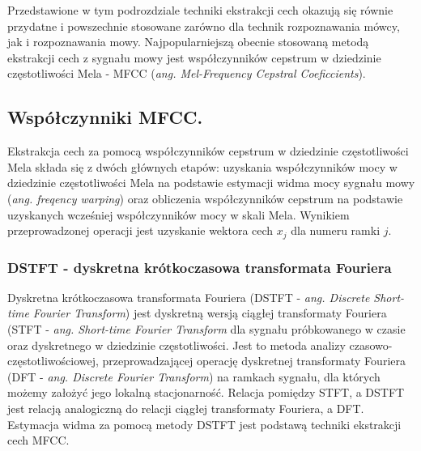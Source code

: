 Przedstawione w tym podrozdziale techniki ekstrakcji cech okazują się równie przydatne i powszechnie stosowane zarówno dla technik rozpoznawania mówcy, jak i rozpoznawania mowy. Najpopularniejszą obecnie stosowaną metodą ekstrakcji cech z sygnału mowy jest współczynników cepstrum w dziedzinie częstotliwości Mela -  MFCC (\textit{ang. Mel-Frequency Cepstral Coeficcients}). 

\subsection{Współczynniki MFCC.}
\label{mfcc}

Ekstrakcja cech za pomocą współczynników cepstrum w dziedzinie częstotliwości Mela składa się z dwóch głównych etapów: uzyskania współczynników mocy w dziedzinie częstotliwości Mela na podstawie estymacji widma mocy sygnału mowy (\textit{ang. freqency warping}) oraz obliczenia współczynników cepstrum na podstawie uzyskanych wcześniej współczynników mocy w skali Mela. Wynikiem przeprowadzonej operacji jest uzyskanie wektora cech $x_j$ dla numeru ramki $j$.

\subsubsection{DSTFT - dyskretna krótkoczasowa transformata Fouriera}
Dyskretna krótkoczasowa transformata Fouriera (DSTFT - \textit{ang. Discrete Short-time Fourier Transform}) jest dyskretną wersją ciągłej transformaty Fouriera (STFT - \textit{ang. Short-time Fourier Transform} dla sygnału próbkowanego w czasie oraz dyskretnego w dziedzinie częstotliwości. Jest to metoda analizy czasowo-częstotliwościowej, przeprowadzającej operację dyskretnej transformaty Fouriera (DFT - \textit{ang. Discrete Fourier Transform}) na ramkach sygnału, dla których możemy założyć jego lokalną stacjonarność. Relacja pomiędzy STFT, a DSTFT jest relacją analogiczną do relacji ciągłej transformaty Fouriera, a DFT.  Estymacja widma za pomocą metody DSTFT jest podstawą techniki ekstrakcji cech MFCC.

